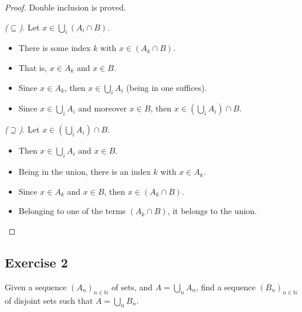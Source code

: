 \documentclass[11pt, a4paper]{article}
\begin{document}
\begin{proof}
Double inclusion is proved.

\textit{($\subseteq$).} Let $x \in \bigcup_{i} (A_i \cap B)$.
\begin{itemize}
    \item There is some index $k$ with $x \in (A_k \cap B)$.
    \item That is, $x \in A_k$ and $x \in B$.
    \item Since $x \in A_k$, then $x \in \bigcup_{i} A_i$ (being in one suffices).
    \item Since $x \in \bigcup_{i} A_i$ and moreover $x \in B$, then $x \in (\bigcup_{i} A_i) \cap B$.
\end{itemize}

\textit{($\supseteq$).} Let $x \in (\bigcup_{i} A_i) \cap B$.
\begin{itemize}
    \item Then $x \in \bigcup_{i} A_i$ and $x \in B$.
    \item Being in the union, there is an index $k$ with $x \in A_k$.
    \item Since $x \in A_k$ and $x \in B$, then $x \in (A_k \cap B)$.
    \item Belonging to one of the terms $(A_k \cap B)$, it belongs to the union.
\end{itemize}
\end{proof}

\subsection*{Exercise 2}

Given a sequence $(A_{n})_{n\in\mathbb{N}}$ of sets, and $A=\bigcup_{n}A_{n}$, find a
sequence $(B_{n})_{n\in\mathbb{N}}$ of disjoint sets such that $A=\bigcup_{n}B_{n}$.
\end{document}
